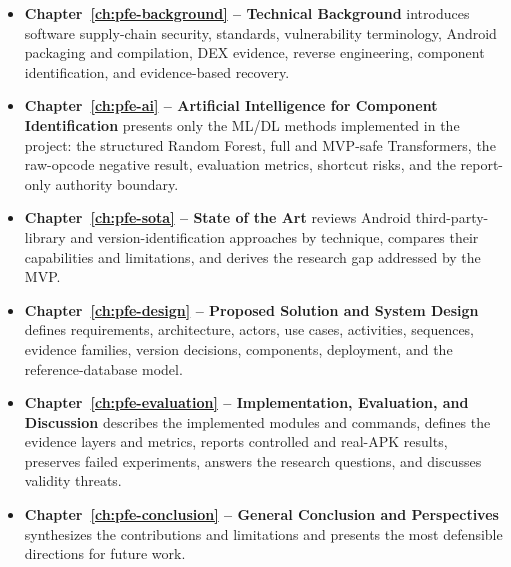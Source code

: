 \begin{itemize}
  \item \textbf{Chapter~\ref{ch:pfe-background} -- Technical Background}
  introduces software supply-chain security, \SBOM standards, vulnerability
  terminology, Android packaging and compilation, DEX evidence, reverse
  engineering, component identification, and evidence-based recovery.

  \item \textbf{Chapter~\ref{ch:pfe-ai} -- Artificial Intelligence for
  Component Identification} presents only the ML/DL methods implemented in
  the project: the structured Random Forest, full and MVP-safe Transformers,
  the raw-opcode negative result, evaluation metrics, shortcut risks, and the
  report-only authority boundary.

  \item \textbf{Chapter~\ref{ch:pfe-sota} -- State of the Art} reviews Android
  third-party-library and version-identification approaches by technique,
  compares their capabilities and limitations, and derives the research gap
  addressed by the MVP.

  \item \textbf{Chapter~\ref{ch:pfe-design} -- Proposed Solution and System
  Design} defines requirements, architecture, actors, use cases, activities,
  sequences, evidence families, version decisions, components, deployment,
  and the reference-database model.

  \item \textbf{Chapter~\ref{ch:pfe-evaluation} -- Implementation, Evaluation,
  and Discussion} describes the implemented modules and commands, defines the
  evidence layers and metrics, reports controlled and real-APK results,
  preserves failed experiments, answers the research questions, and discusses
  validity threats.

  \item \textbf{Chapter~\ref{ch:pfe-conclusion} -- General Conclusion and
  Perspectives} synthesizes the contributions and limitations and presents
  the most defensible directions for future work.
\end{itemize}
